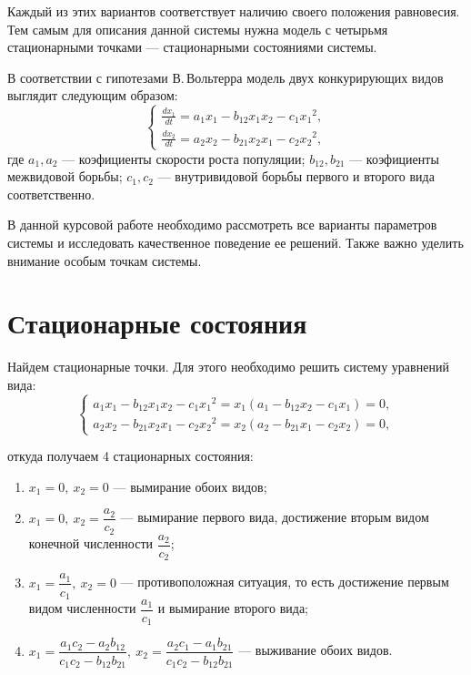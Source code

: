 \documentclass[12pt,a4paper]{article}
\begin{document}
    Каждый из этих вариантов соответствует наличию своего положения равновесия. Тем самым для описания данной системы нужна модель с четырьмя стационарными точками --- стационарными состояниями системы.

    В соответствии с гипотезами В.\,Вольтерра модель двух конкурирующих видов выглядит следующим образом:
    \begin{equation}
        \label{volterra}
        \begin{cases}
            \frac{dx_1}{dt} = a_1 x_1 - b_{12} x_1 x_2 - c_1 {x_1}\!^2,
            \\
            \frac{dx_2}{dt} = a_2 x_2 - b_{21} x_2 x_1 - c_2 {x_2}\!^2 ,
        \end{cases}
    \end{equation}
    \noindent где $a_1, a_2$ --- коэфициенты скорости роста популяции; $b_{12}, b_{21}$ --- коэфициенты межвидовой борьбы; $c_1, c_2$ --- внутривидовой борьбы первого и второго вида соответственно.

    В данной курсовой работе необходимо рассмотреть все варианты параметров системы и исследовать качественное поведение ее решений. Также важно уделить внимание особым точкам системы.

    \section{Стационарные состояния}

    Найдем стационарные точки. Для этого необходимо решить систему уравнений вида: 
    \begin{equation}
        \label{seps}
        \begin{cases}
            a_1 x_1 - b_{12} x_1 x_2 - c_1 {x_1}\!^2 = x_1 (a_1 - b_{12} x_2 - c_1 x_1) = 0,
            \\
            a_2 x_2 - b_{21} x_2 x_1 - c_2 {x_2}\!^2 = x_2 (a_2 - b_{21} x_1 - c_2 x_2) = 0,
        \end{cases}
    \end{equation}
    
    \noindent откуда получаем 4 стационарных состояния:
    \begin{enumerate}
        \setlength\itemsep{0.5em}
        \item $ x_1 = 0,\ x_2 = 0 $ --- вымирание обоих видов;
        \item $ x_1 = 0,\ x_2 = \dfrac{a_2}{c_2} $ --- вымирание первого вида, достижение вторым видом конечной численности $ \dfrac{a_2}{c_2} $;
        \item $ x_1 = \dfrac{a_1}{c_1},\ x_2 = 0 $ --- противоположная ситуация, то есть достижение первым видом численности $ \dfrac{a_1}{c_1} $ и вымирание второго вида;
        \item $ x_1 = \dfrac{a_1 c_2 - a_2 b_{12}}{c_1 c_2 - b_{12} b_{21}},\ x_2 = \dfrac{a_2 c_1 - a_1 b_{21}}{c_1 c_2 - b_{12} b_{21}}$ --- выживание обоих видов.
    \end{enumerate} 
\end{document}
